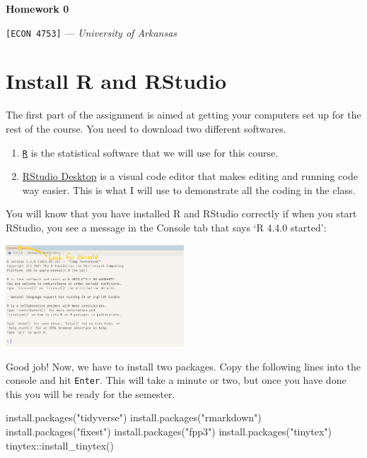 \documentclass[12pt]{article}
\newenvironment{Shaded}{\begin{snugshade}}{\end{snugshade}}
\newcommand{\FunctionTok}[1]{\textcolor[rgb]{0.28,0.35,0.67}{#1}}
\newcommand{\NormalTok}[1]{\textcolor[rgb]{0.00,0.23,0.31}{#1}}
\newcommand{\SpecialCharTok}[1]{\textcolor[rgb]{0.37,0.37,0.37}{#1}}
\newcommand{\StringTok}[1]{\textcolor[rgb]{0.13,0.47,0.30}{#1}}
\begin{document}
\begin{center}
  {\Huge\bf Homework 0}
  
  \smallskip
  {\large\texttt{[ECON 4753]} — \textit{University of Arkansas}}

\end{center}

\section{Install R and RStudio}\label{install-r-and-rstudio}

The first part of the assignment is aimed at getting your computers set
up for the rest of the course. You need to download two different
softwares.

\begin{enumerate}
\def\labelenumi{\arabic{enumi}.}
\item
  \href{https://cloud.r-project.org/}{\texttt{R}} is the statistical
  software that we will use for this course.
\item
  \href{https://posit.co/download/rstudio-desktop/}{RStudio Desktop} is
  a visual code editor that makes editing and running code way easier.
  This is what I will use to demonstrate all the coding in the class.
\end{enumerate}

You will know that you have installed R and RStudio correctly if when
you start RStudio, you see a message in the Console tab that says `R
4.4.0 started':

\includegraphics[width=0.5\textwidth,height=\textheight]{R-startup.png}

Good job! Now, we have to install two packages. Copy the following lines
into the console and hit \texttt{Enter}. This will take a minute or two,
but once you have done this you will be ready for the semester.

\begin{Shaded}
\begin{Highlighting}[]
\FunctionTok{install.packages}\NormalTok{(}\StringTok{"tidyverse"}\NormalTok{)}
\FunctionTok{install.packages}\NormalTok{(}\StringTok{"rmarkdown"}\NormalTok{)}
\FunctionTok{install.packages}\NormalTok{(}\StringTok{"fixest"}\NormalTok{)}
\FunctionTok{install.packages}\NormalTok{(}\StringTok{"fpp3"}\NormalTok{)}
\FunctionTok{install.packages}\NormalTok{(}\StringTok{"tinytex"}\NormalTok{)}
\NormalTok{tinytex}\SpecialCharTok{::}\FunctionTok{install\_tinytex}\NormalTok{()}
\end{Highlighting}
\end{Shaded}
\end{document}
